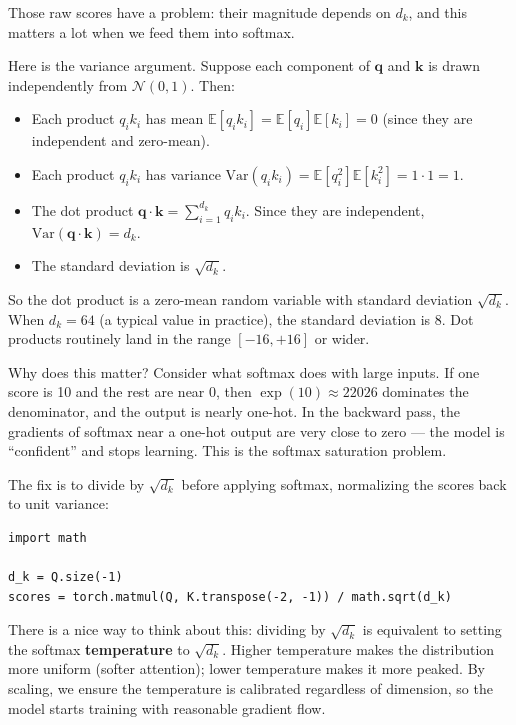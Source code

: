 Those raw scores have a problem: their magnitude depends on $d_k$, and this matters a lot when we feed them into softmax.

Here is the variance argument. Suppose each component of $\mathbf{q}$ and $\mathbf{k}$ is drawn independently from $\mathcal{N}(0, 1)$. Then:

\begin{itemize}
  \item Each product $q_i k_i$ has mean $\mathbb{E}[q_i k_i] = \mathbb{E}[q_i]\mathbb{E}[k_i] = 0$ (since they are independent and zero-mean).
  \item Each product $q_i k_i$ has variance $\mathrm{Var}(q_i k_i) = \mathbb{E}[q_i^2]\mathbb{E}[k_i^2] = 1 \cdot 1 = 1$.
  \item The dot product $\mathbf{q} \cdot \mathbf{k} = \sum_{i=1}^{d_k} q_i k_i$. Since they are independent, $\mathrm{Var}(\mathbf{q} \cdot \mathbf{k}) = d_k$.
  \item The standard deviation is $\sqrt{d_k}$.
\end{itemize}

So the dot product is a zero-mean random variable with standard deviation $\sqrt{d_k}$. When $d_k = 64$ (a typical value in practice), the standard deviation is 8. Dot products routinely land in the range $[-16, +16]$ or wider.

Why does this matter? Consider what softmax does with large inputs. If one score is 10 and the rest are near 0, then $\exp(10) \approx 22026$ dominates the denominator, and the output is nearly one-hot. In the backward pass, the gradients of softmax near a one-hot output are very close to zero --- the model is ``confident'' and stops learning. This is the softmax saturation problem.

The fix is to divide by $\sqrt{d_k}$ before applying softmax, normalizing the scores back to unit variance:

\demotag
\begin{lstlisting}
import math

d_k = Q.size(-1)
scores = torch.matmul(Q, K.transpose(-2, -1)) / math.sqrt(d_k)
\end{lstlisting}

There is a nice way to think about this: dividing by $\sqrt{d_k}$ is equivalent to setting the softmax \textbf{temperature} to $\sqrt{d_k}$. Higher temperature makes the distribution more uniform (softer attention); lower temperature makes it more peaked. By scaling, we ensure the temperature is calibrated regardless of dimension, so the model starts training with reasonable gradient flow.


